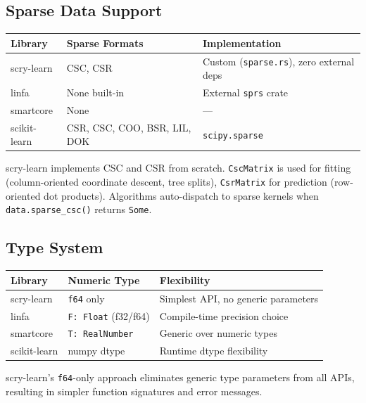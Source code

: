 \documentclass[11pt,a4paper]{article}
\begin{document}
\subsection{Sparse Data Support}

\begin{center}
\begin{tabular}{lll}
\toprule
\textbf{Library} & \textbf{Sparse Formats} & \textbf{Implementation} \\
\midrule
scry-learn & CSC, CSR & Custom (\texttt{sparse.rs}), zero external deps \\
linfa & None built-in & External \texttt{sprs} crate \\
smartcore & None & --- \\
scikit-learn & CSR, CSC, COO, BSR, LIL, DOK & \texttt{scipy.sparse} \\
\bottomrule
\end{tabular}
\end{center}

scry-learn implements CSC and CSR from scratch. \texttt{CscMatrix} is used for fitting (column-oriented coordinate descent, tree splits), \texttt{CsrMatrix} for prediction (row-oriented dot products). Algorithms auto-dispatch to sparse kernels when \texttt{data.sparse\_csc()} returns \texttt{Some}.

\subsection{Type System}

\begin{center}
\begin{tabular}{lll}
\toprule
\textbf{Library} & \textbf{Numeric Type} & \textbf{Flexibility} \\
\midrule
scry-learn & \texttt{f64} only & Simplest API, no generic parameters \\
linfa & \texttt{F: Float} (f32/f64) & Compile-time precision choice \\
smartcore & \texttt{T: RealNumber} & Generic over numeric types \\
scikit-learn & numpy dtype & Runtime dtype flexibility \\
\bottomrule
\end{tabular}
\end{center}

scry-learn's \texttt{f64}-only approach eliminates generic type parameters from all APIs, resulting in simpler function signatures and error messages.
\end{document}
